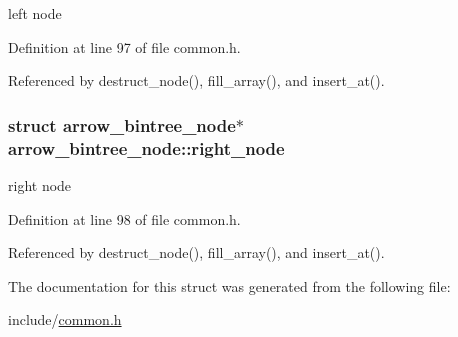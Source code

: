 left node 

Definition at line 97 of file common.h.

Referenced by destruct\_\-node(), fill\_\-array(), and insert\_\-at().\hypertarget{structarrow__bintree__node_4875801983f2b0220212951e6c0130af}{
\subsubsection[{right\_\-node}]{\setlength{\rightskip}{0pt plus 5cm}struct {\bf arrow\_\-bintree\_\-node}$\ast$ {\bf arrow\_\-bintree\_\-node::right\_\-node}}}
\label{structarrow__bintree__node_4875801983f2b0220212951e6c0130af}


right node 

Definition at line 98 of file common.h.

Referenced by destruct\_\-node(), fill\_\-array(), and insert\_\-at().

The documentation for this struct was generated from the following file:\begin{CompactItemize}
\item 
include/\hyperlink{common_8h}{common.h}\end{CompactItemize}
